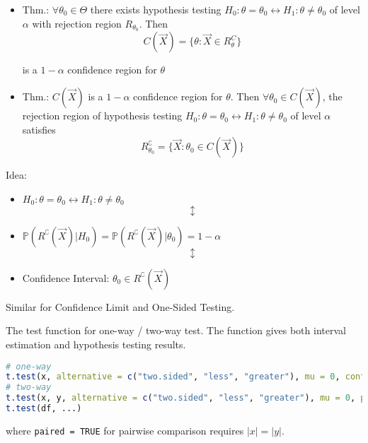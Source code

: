 \begin{itemize}
    \item Thm.: $\forall\theta_0\in\Theta$ there exists hypothesis testing $H_0:\theta=\theta_0\longleftrightarrow H_1:\theta\neq\theta_0$ of level $\alpha$ with rejection region $R_{\theta_0}$. Then
    \begin{equation}
        C(\vec{X})=\{\theta:\vec{X}\in R^C_{\theta}\}
    \end{equation}

    is a $1-\alpha$ confidence region for $\theta$

    \item Thm.: $C(\vec{X})$ is a $1-\alpha$ confidence region for $\theta$. Then $\forall\theta_0\in C(\vec{X})$, the rejection region of hypothesis testing $H_0:\theta=\theta_0\longleftrightarrow H_1:\theta\neq\theta_0$ of level $\alpha$ satisfies
    \begin{equation}
    R^\complement_{\theta_0}=\{\vec{X}:\theta_0\in C(\vec{X})\}
    \end{equation}
\end{itemize}
    
    \begin{point}
        Idea:
    \end{point}
    
        
\begin{itemize}[itemsep=-3pt]
    \item[] \centering $H_0:\theta=\theta_0\longleftrightarrow H_1:\theta\neq\theta_0$
    \begin{equation*}\updownarrow\end{equation*}
    \item[] \centering $\mathbb{P}(R^\complement(\vec{X})|H_0)=\mathbb{P}(R^\complement(\vec{X})|\theta_0)=1-\alpha$
    \begin{equation*}\updownarrow\end{equation*}
    \item[] Confidence Interval: $\theta_0\in R^\complement(\vec{X})$
\end{itemize}

    Similar for Confidence Limit and One-Sided Testing.

\hypertarget{CODEttest}{}
\begin{rcode}
The test function for one-way / two-way test. The function gives both interval estimation and hypothesis testing results.
\begin{lstlisting}[language=R]
# one-way
t.test(x, alternative = c("two.sided", "less", "greater"), mu = 0, conf.level = 0.95, ...)
# two-way
t.test(x, y, alternative = c("two.sided", "less", "greater"), mu = 0, paired = FALSE, var.equal = FALSE, conf.level = 0.95, ...)
t.test(df, ...) 
\end{lstlisting}
where \lstinline|paired = TRUE| for pairwise comparison requires $ |x|=|y| $.
\end{rcode}

